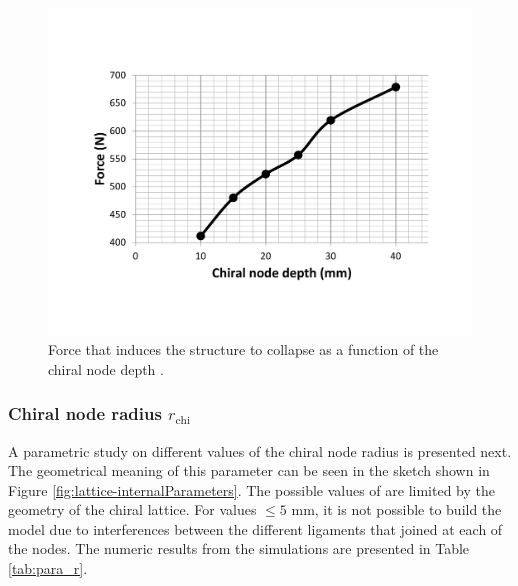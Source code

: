       \begin{figure}[!htpb] %
        \centering
        \includegraphics[width=0.8 \textwidth]{figures/result-sim/B/force_B}
        \caption[Force that induces the structure to collapse as a function of the chiral node depth]{Force that induces the structure to collapse as a function of the chiral node depth \chiB.}\label{fig:force_B}
      \end{figure}

    \clearpage
    \subsubsection{Chiral node radius $r_{\mathrm{chi}}$}

      A parametric study on different values of the chiral node radius \chir is presented next. The geometrical meaning of this parameter can be seen in the sketch shown in Figure \ref{fig:lattice-internalParameters}. The possible values of \chir are limited by the geometry of the chiral lattice. For values \chir$\le 5$ mm, it is not possible to build the model due to interferences between the different ligaments that joined at each of the nodes. The numeric results from the simulations are presented in Table \ref{tab:para_r}.


